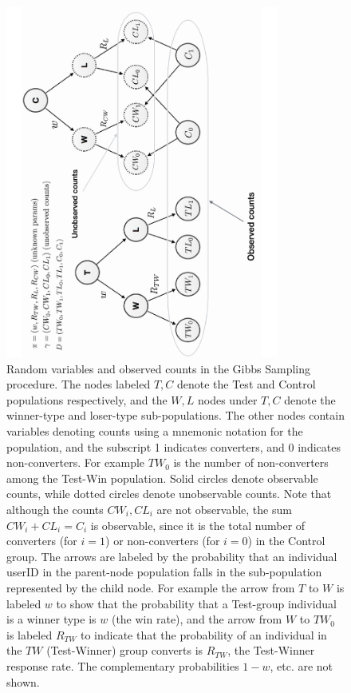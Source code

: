 \documentclass[11pt,a4paper]{article}
\theoremstyle{definition}
\theoremstyle{remark}
\theoremstyle{definition}
\theoremstyle{definition}
\theoremstyle{definition}
\theoremstyle{definition}
\theoremstyle{definition}
\theoremstyle{definition}
\begin{document}
\begin{figure} \small \centering
\includegraphics[width=0.8\textwidth,angle=270]{gibbs-math.pdf}
\caption{\small Random variables and observed counts in the Gibbs Sampling procedure. The nodes labeled $T, C$ denote the Test and Control populations respectively, and the $W, L$ nodes under $T, C$ denote the winner-type and loser-type sub-populations. The other nodes contain variables denoting counts using a mnemonic notation for the population, and the subscript 1 indicates converters, and 0 indicates non-converters. For example $TW_0$ is the number of non-converters among the Test-Win population. Solid circles denote observable counts, while dotted circles denote unobservable counts. Note that although the counts $CW_i, CL_i$ are not observable, the sum $CW_i + CL_i = C_i$ is observable, since it is the total number of converters (for $i=1$) or non-converters (for $i=0$) in the Control group. The arrows are labeled by the probability that an individual userID in the parent-node population falls in the sub-population represented by the child node. For example the arrow from $T$ to $W$ is labeled $w$ to show that the probability that a Test-group individual is a winner type is $w$ (the win rate), and the arrow from $W$ to $TW_0$ is labeled $R_{TW}$ to indicate that the probability of an individual in the $TW$ (Test-Winner) group converts is $R_{TW}$, the Test-Winner response rate. The complementary probabilities $1-w$, etc. are not shown.}
\label{fig-gibbs}
\end{figure}
\end{document}
